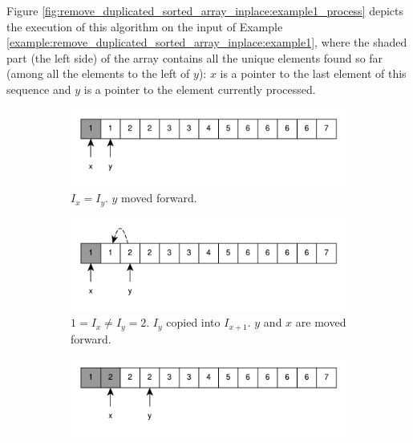 Figure \ref{fig:remove_duplicated_sorted_array_inplace:example1_process} depicts the execution of this algorithm on the input of Example \ref{example:remove_duplicated_sorted_array_inplace:example1}, where the shaded part (the left side) of the array contains all the unique elements found so far (among all the elements to the left of $y$): $x$ is a pointer to the last element of this sequence and $y$ is a pointer to the element currently processed.


\begin{figure}
	\centering
	\vspace*{0.0in}
	\begin{subfigure}[t]{0.49\textwidth}
		\includegraphics[width=1\linewidth]{sources/remove_duplicated_sorted_array_inplace/images/example1_1}
		\vspace*{-8mm}
		\caption{$I_x = I_y$. $y$ moved forward.}
		\label{fig:remove_duplicated_sorted_array_inplace:example1_1}
	 \end{subfigure}
	 \hfill
	 \begin{subfigure}[t]{0.49\textwidth}
		\includegraphics[width=1\linewidth]{sources/remove_duplicated_sorted_array_inplace/images/example1_2}
		\vspace*{-8mm}
		\caption{$1 = I_x \neq I_y = 2$. $I_y$ copied into $I_{x+1}$. $y$ and $x$ are moved forward.}
		\label{fig:remove_duplicated_sorted_array_inplace:example1_2}
	 \end{subfigure}
	 \hfill
	 \begin{subfigure}[t]{0.49\textwidth}
		\includegraphics[width=1\linewidth]{sources/remove_duplicated_sorted_array_inplace/images/example1_3}

\end{subfigure}
\end{figure}
